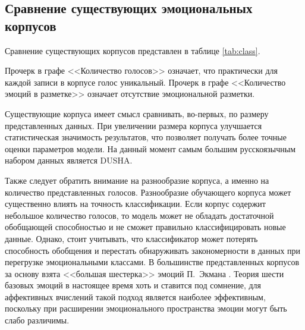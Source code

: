 \subsection{Сравнение существующих эмоциональных корпусов}
Сравнение существующих корпусов представлен в таблице \ref{tab:class}. 
\begin{table}[H]
	\centering
	\caption{Сравнение существующих эмоциональных корпусов}\label{tab:class}
\end{table}
Прочерк в графе <<Количество голосов>> означает, что практически для каждой записи в корпусе голос уникальный. Прочерк в графе <<Количество эмоций в разметке>> означает отсутствие эмоциональной разметки.

Существующие корпуса имеет смысл сравнивать, во-первых, по размеру представленных данных. При увеличении размера корпуса улучшается статистическая значимость результатов, что позволяет получать более точные оценки параметров модели. На данный момент самым большим русскоязычным набором данных является DUSHA. 

Также следует обратить внимание на разнообразие корпуса, а именно на количество представленных голосов. Разнообразие обучающего корпуса может существенно влиять на точность классификации. Если корпус содержит небольшое количество голосов, то модель может не обладать достаточной обобщающей способностью и не сможет правильно классифицировать новые данные. Однако, стоит учитывать, что классификатор может потерять способность обобщения и перестать обнаруживать закономерности в данных при перегрузке эмоциональными классами. В большинстве представленных корпусов за основу взята <<большая шестерка>> эмоций П.~Экмана \cite{Ekman1972}. Теория шести базовых эмоций в настоящее время хоть и ставится под сомнение, для аффективных вчислений такой подход является наиболее эффективным, поскольку при расширении эмоционального пространства эмоции могут быть слабо различимы. 

